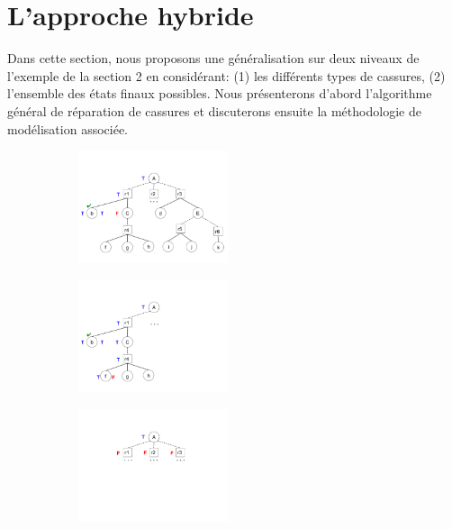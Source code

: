\documentclass[a4paper,twoside,french]{article}
\begin{document}
		\section{L'approche hybride}
		Dans cette section, nous proposons une généralisation sur deux niveaux de l'exemple de la section 2 en considérant: (1) les différents types de cassures, (2) l'ensemble des états finaux possibles. Nous présenterons d'abord l'algorithme général de réparation de cassures et discuterons ensuite la méthodologie de modélisation associée.
			\begin{figure}[t]
				\centering
				\begin{subfigure}{2.1in}
					\centerline{\includegraphics[height=1.3in]{figs/precondition}}
					\vskip 8pt 
				\end{subfigure}
				\hfill
				\begin{subfigure}{1.4in}
					\centerline{\includegraphics[height=1.3in]{figs/postcondition}}
					\vskip 8pt 
				\end{subfigure}
				\hfill
				\begin{subfigure}{1in}
					\centerline{\includegraphics[height=1.3in]{figs/applicability}}
					\vskip -2pt
				\end{subfigure}
				\vskip 4pt 
			\end{figure}
			
\end{document}
